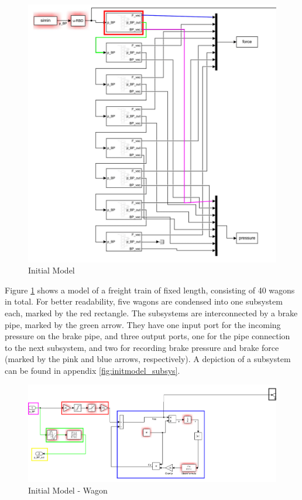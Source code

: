 \begin{figure}[H]
	\centering
	\includegraphics[width=\linewidth]{./pic/initmodel_whole}
	\caption{Initial Model}
	\label{fig:initmodel_whole}
\end{figure}

\par\noindent
Figure \ref{fig:initmodel_whole} shows a model of a freight train of fixed length, consisting of 40 wagons in total. For better readability, five wagons are condensed into one subsystem each, marked by the red rectangle. The subsystems are interconnected by a brake pipe, marked by the green arrow. They have one input port for the incoming pressure on the brake pipe, and three output ports, one for the pipe connection to the next subsystem, and two for recording brake pressure and brake force (marked by the pink and blue arrows, respectively). A depiction of a subsystem can be found in appendix \ref{fig:initmodel_subsys}.  

\begin{figure}[H]
	\centering
	\includegraphics[width=\linewidth]{./pic/initmodel_wagon}
	\caption{Initial Model - Wagon}
	\label{fig:initmodel_wagon}
\end{figure}

